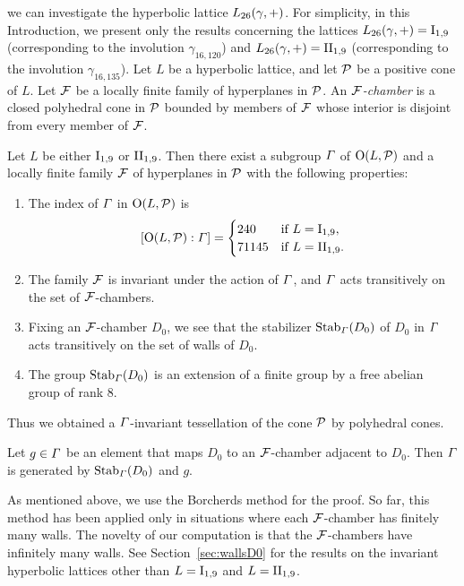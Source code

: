 \documentclass{amsart} %
\begin{document}
we can investigate %
the hyperbolic lattice $L_{26}(\gamma, +)$.
For simplicity, 
in this Introduction, 
we present only the results concerning
 the lattices $L_{26}(\gamma, +)=\mathrm{I}_{1,9}$ (corresponding to the involution $\gamma_{16,120}$) 
and $L_{26}(\gamma, +)=\mathrm{II}_{1,9}$ (corresponding to the involution $\gamma_{16,135}$).
Let $L$ be a hyperbolic lattice, 
and let $\mathord{\mathcal{P}}$ be a positive cone of $L$.
 Let $\mathord{\mathcal{F}}$ be a locally finite family of hyperplanes in $\mathord{\mathcal{P}}$. 
 An \emph{$\mathord{\mathcal{F}}$-chamber} is a closed polyhedral cone in $\mathord{\mathcal{P}}$ 
 bounded by members of $\mathord{\mathcal{F}}$ whose interior is disjoint from every member of $\mathord{\mathcal{F}}$.
%
%
\begin{theorem}\label{thm:main3}
Let $L$ be either $\mathrm{I}_{1,9}$ or $\mathrm{II}_{1,9}$. 
Then there exist a subgroup $\varGamma$ 
of $\mathord{\mathrm{O}}(L,\mathord{\mathcal{P}})$ and a locally finite family $\mathord{\mathcal{F}}$ of hyperplanes in $\mathord{\mathcal{P}}$
with the following properties:
\begin{enumerate}[label={\rm(\roman*)}]
%
\item
The index of $\varGamma$ in $\mathord{\mathrm{O}}(L,\mathord{\mathcal{P}})$ is 
\[
[\mathord{\mathrm{O}}(L,\mathord{\mathcal{P}}): \varGamma]=\begin{cases}
240 & \textrm{if $L=\mathrm{I}_{1,9}$}, \\
71145 & \textrm{if $L=\mathrm{II}_{1,9}$}. \\
\end{cases}
\]
\item The family $\mathord{\mathcal{F}}$ is invariant under the action of $\varGamma$, 
and $\varGamma$ acts transitively on the set of $\mathord{\mathcal{F}}$-chambers.
\item Fixing an $\mathord{\mathcal{F}}$-chamber $D_0$,
we see that the stabilizer $\operatorname{Stab}_{\varGamma}(D_0)$ of $D_0$ in $\varGamma$
 acts transitively on the set of walls of $D_0$.
 \item 
 The group 
 $\operatorname{Stab}_{\varGamma}(D_0)$ is an extension of a finite group by a free abelian group of rank $8$.
\end{enumerate}
\end{theorem}
%
Thus we obtained a $\varGamma$-invariant tessellation of the cone $\mathord{\mathcal{P}}$ by polyhedral cones.
%
\begin{corollary}\label{thm:CorOfmain3}
Let $g\in\varGamma$ be an element that maps $D_0$ to an $\mathord{\mathcal{F}}$-chamber adjacent to $D_0$. 
Then $\varGamma$ is generated by $\operatorname{Stab}_{\varGamma}(D_0)$ and $g$.
\end{corollary}
%
As mentioned above, we use the Borcherds method for the proof. 
So far, 
 this method has been applied only in situations where each $\mathord{\mathcal{F}}$-chamber has finitely many walls. 
 The novelty of our computation is that 
 the $\mathord{\mathcal{F}}$-chambers have infinitely many walls. 
See Section~\ref{sec:wallsD0} for the results on the invariant hyperbolic lattices
other than $L=\mathrm{I}_{1,9}$ and $L=\mathrm{II}_{1,9}$.
%
\end{document}

